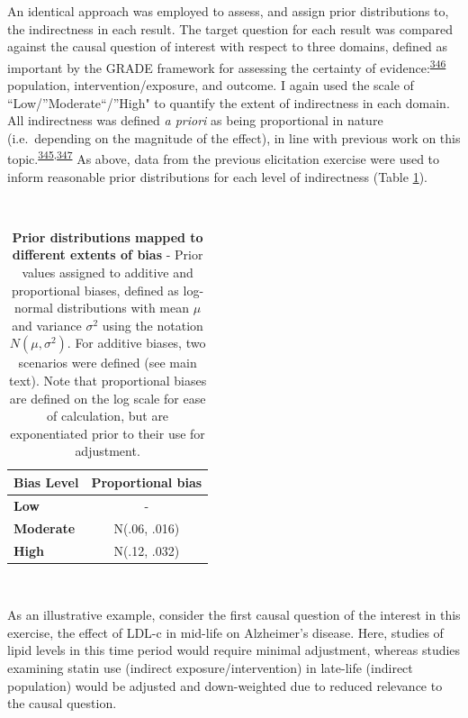 \documentclass[a4paper, twoside]{templates/ociamthesis}
\begin{document}
An identical approach was employed to assess, and assign prior distributions to, the indirectness in each result. The target question for each result was compared against the causal question of interest with respect to three domains, defined as important by the GRADE framework for assessing the certainty of evidence:\textsuperscript{\protect\hyperlink{ref-guyatt2011}{346}} population, intervention/exposure, and outcome. I again used the scale of ``Low/''Moderate``/''High" to quantify the extent of indirectness in each domain. All indirectness was defined \emph{a priori} as being proportional in nature (i.e.~depending on the magnitude of the effect), in line with previous work on this topic.\textsuperscript{\protect\hyperlink{ref-turner2009}{345},\protect\hyperlink{ref-thompson2011}{347}} As above, data from the previous elicitation exercise were used to inform reasonable prior distributions for each level of indirectness (Table \ref{tab:priorsIndirect-table}).

~





\begin{table}[H]

\caption[Prior distributions mapped to different extents of bias.]{\label{tab:priorsIndirect-table}\textbf{Prior distributions mapped to different extents of bias} - Prior values assigned to additive and proportional biases, defined as log-normal distributions with mean \(\mu\) and variance \(\sigma^2\) using the notation \(N(\mu,\sigma^{2})\). For additive biases, two scenarios were defined (see main text). Note that proportional biases are defined on the log scale for ease of calculation, but are exponentiated prior to their use for adjustment.}
\centering
\begin{tabular}[t]{>{}lc}
\toprule
\textbf{Bias Level} & \textbf{Proportional bias}\\
\midrule
\textbf{Low} & -\\
\midrule
\textbf{Moderate} & N(.06, .016)\\
\midrule
\textbf{High} & N(.12, .032)\\
\bottomrule
\end{tabular}
\end{table}

~

As an illustrative example, consider the first causal question of the interest in this exercise, the effect of LDL-c in mid-life on Alzheimer's disease. Here, studies of lipid levels in this time period would require minimal adjustment, whereas studies examining statin use (indirect exposure/intervention) in late-life (indirect population) would be adjusted and down-weighted due to reduced relevance to the causal question.
\end{document}
